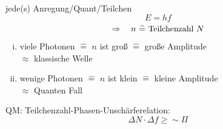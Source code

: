 jede(s) Anregung/Quant/Teilchen
\begin{equation*}
E = hf
\end{equation*}
\begin{equation*}
\Rightarrow \quad n \ \widehat{=} \textrm{ Teilchenzahl } N
\end{equation*}
\begin{enumerate}[i)]
	\item viele Photonen $ \widehat{=} $ $ n $ ist groß $ \widehat{=} $ große Amplitude\\
	$ \approx $ klassische Welle
	\item wenige Photonen $ \widehat{=} $ $ n $ ist klein $ \widehat{=} $ kleine Amplitude\\
	$ \approx $ Quanten Fall
\end{enumerate}
QM: Teilchenzahl-Phasen-Unschärferelation:
\begin{equation*}
\Delta N \cdot \Delta f \ge \sim \Pi
\end{equation*}